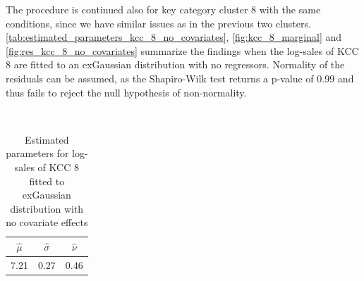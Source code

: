 
The procedure is continued also for key category cluster 8 with the same conditions, since we have similar issues as in the previous two clusters.
\\

\autoref{tab:estimated_parameters_kcc_8_no_covariates}, \autoref{fig:kcc_8_marginal} and \autoref{fig:res_kcc_8_no_covariates} summarize the findings when the log-sales of \ac{KCC} 8 are fitted to an exGaussian distribution with no regressors. Normality of the residuals can be assumed, as the Shapiro-Wilk test returns a p-value of 0.99 and thus fails to reject the null hypothesis of non-normality.
\\



\begin{table}[H]
\setlength\arrayrulewidth{1pt}  
\centering
\begin{adjustbox}{max width=\textwidth}\
\begin{tabular}{|c|c|c|}
\hline
\rowcolor{lightgray} 
$\hat{\mu}$ & $\hat{\sigma}$ & $\hat{\nu}$ \\ \hline
7.21        & 0.27           & 0.46        \\ \hline
\end{tabular}
\end{adjustbox}
\caption{Estimated parameters for log-sales of KCC 8 fitted to exGaussian distribution with no covariate effects}
\label{tab:estimated_parameters_kcc_8_no_covariates}
\end{table}



